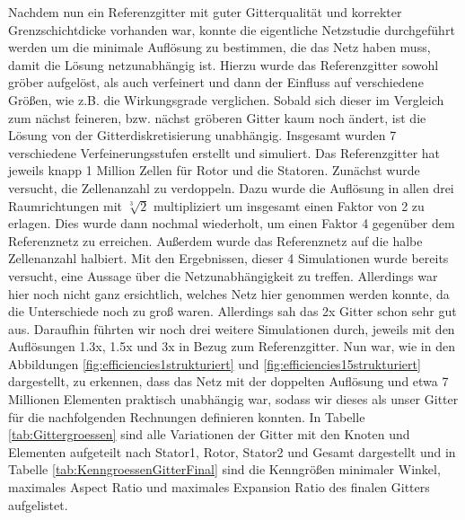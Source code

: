 Nachdem nun ein Referenzgitter mit guter Gitterqualität und korrekter Grenzschichtdicke vorhanden war, konnte die eigentliche Netzstudie durchgeführt werden um die minimale Auflösung zu bestimmen, die das Netz haben muss, damit die Lösung netzunabhängig ist. Hierzu wurde das Referenzgitter sowohl gröber aufgelöst, als auch verfeinert und dann der Einfluss auf verschiedene Größen, wie z.B. die Wirkungsgrade verglichen. Sobald sich dieser im Vergleich zum nächst feineren, bzw. nächst gröberen Gitter kaum noch ändert, ist die Lösung von der Gitterdiskretisierung unabhängig. 
Insgesamt wurden 7 verschiedene Verfeinerungsstufen erstellt und simuliert. Das Referenzgitter hat jeweils knapp 1 Million Zellen für Rotor und die Statoren. Zunächst wurde versucht, die Zellenanzahl zu verdoppeln. Dazu wurde die Auflösung in allen drei Raumrichtungen mit $\sqrt[3]{2}$ multipliziert um insgesamt einen Faktor von 2 zu erlagen. Dies wurde dann nochmal wiederholt, um einen Faktor 4 gegenüber dem Referenznetz zu erreichen. Außerdem wurde das Referenznetz auf die halbe Zellenanzahl halbiert. Mit den Ergebnissen, dieser 4 Simulationen wurde bereits versucht, eine Aussage über die Netzunabhängigkeit zu treffen. Allerdings war hier noch nicht ganz ersichtlich, welches Netz hier genommen werden konnte, da die Unterschiede noch zu groß waren. Allerdings sah das 2x Gitter schon sehr gut aus. Daraufhin führten wir noch drei weitere Simulationen durch, jeweils mit den Auflösungen 1.3x, 1.5x und 3x in Bezug zum Referenzgitter. Nun war, wie in den Abbildungen \ref{fig:efficiencies1strukturiert} und  \ref{fig:efficiencies15strukturiert} dargestellt, zu erkennen, dass das Netz mit der doppelten Auflösung und etwa 7 Millionen Elementen praktisch unabhängig war, sodass wir dieses als unser Gitter für die nachfolgenden Rechnungen definieren konnten. 
In Tabelle \ref{tab:Gittergroessen} sind alle Variationen der Gitter mit den Knoten und Elementen aufgeteilt nach Stator1, Rotor, Stator2 und Gesamt dargestellt und in Tabelle \ref{tab:KenngroessenGitterFinal}  sind die Kenngrößen minimaler Winkel, maximales Aspect Ratio und maximales Expansion Ratio des finalen Gitters aufgelistet.

